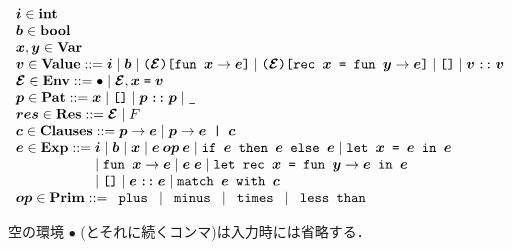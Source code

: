 \documentclass[11pt]{jarticle}
\begin{document}
\[\begin{array}{l}
\EvalMLvMV{i}[] \in \mathbf{int}\\
\EvalMLvMV{b}[] \in \mathbf{bool}\\
\EvalMLvMV{x}[], \EvalMLvMV{y}[] \in \mathbf{Var}\\
\EvalMLvMV{v}[] \in \mathbf{Value} ::= \EvalMLvMV{i}[] \mid \EvalMLvMV{b}[]
\mid \EvalMLvFunTerm{\EvalMLvMV{env}[]}{\EvalMLvMV{x}[]}{\EvalMLvMV{e}[]}
\mid \EvalMLvRecTerm{\EvalMLvMV{env}[]}{\EvalMLvMV{x}[]}{\EvalMLvMV{y}[]}
{\EvalMLvMV{e}[]} \mid \EvalMLvNilVTerm
\mid \EvalMLvConsVTerm{\EvalMLvMV{v}[]}{\EvalMLvMV{v}[]}\\
\EvalMLvMV{env}[] \in \mathbf{Env} ::= \EvalMLvEmptyTerm
\mid \EvalMLvBindTerm{\EvalMLvMV{env}[]}{\EvalMLvMV{x}[]}
{\EvalMLvMV{v}[]}\\
\EvalMLvMV{p}[] \in \mathbf{Pat} ::= \EvalMLvMV{x}[] \mid \EvalMLvNilPTerm
\mid \EvalMLvConsPTerm{\EvalMLvMV{p}[]}{\EvalMLvMV{p}[]}
\mid \EvalMLvWildPTerm\\
\EvalMLvMV{res}[] \in \mathbf{Res} ::= \EvalMLvMV{env}[]
\mid \EvalMLvFailTerm\\
\EvalMLvMV{c}[] \in \mathbf{Clauses} ::= \EvalMLvSingleCTerm{\EvalMLvMV{p}[]}
{\EvalMLvMV{e}[]} \mid \EvalMLvAddCTerm{\EvalMLvMV{p}[]}{\EvalMLvMV{e}[]}
{\EvalMLvMV{c}[]}\\
\EvalMLvMV{e}[] \in \mathbf{Exp} ::= \EvalMLvMV{i}[] \mid \EvalMLvMV{b}[]
\mid \EvalMLvMV{x}[] \mid \EvalMLvBinOpTerm{\EvalMLvMV{op}[]}
{\EvalMLvMV{e}[]}{\EvalMLvMV{e}[]} \mid \EvalMLvIfTerm{\EvalMLvMV{e}[]}
{\EvalMLvMV{e}[]}{\EvalMLvMV{e}[]} \mid \EvalMLvLetTerm{\EvalMLvMV{x}[]}
{\EvalMLvMV{e}[]}{\EvalMLvMV{e}[]}  \\ \hspace*{2.0cm}
\mid \EvalMLvAbsTerm{\EvalMLvMV{x}[]}
{\EvalMLvMV{e}[]} \mid \EvalMLvAppTerm{\EvalMLvMV{e}[]}{\EvalMLvMV{e}[]}
\mid \EvalMLvLetRecTerm{\EvalMLvMV{x}[]}{\EvalMLvMV{y}[]}{\EvalMLvMV{e}[]}
{\EvalMLvMV{e}[]}  \\ \hspace*{2.0cm}
\mid \EvalMLvNilTerm \mid \EvalMLvConsTerm{\EvalMLvMV{e}[]}
{\EvalMLvMV{e}[]} \mid \EvalMLvMatchTerm{\EvalMLvMV{e}[]}
{\EvalMLvMV{c}[]}\\
\EvalMLvMV{op}[] \in \mathbf{Prim} ::= \EvalMLvPlusTerm
\mid \EvalMLvMinusTerm \mid \EvalMLvMultTerm
\mid \EvalMLvLtTerm\\
\end{array}\]

空の環境 \(\bullet\) (とそれに続くコンマ)は入力時には省略する．
\end{document}
